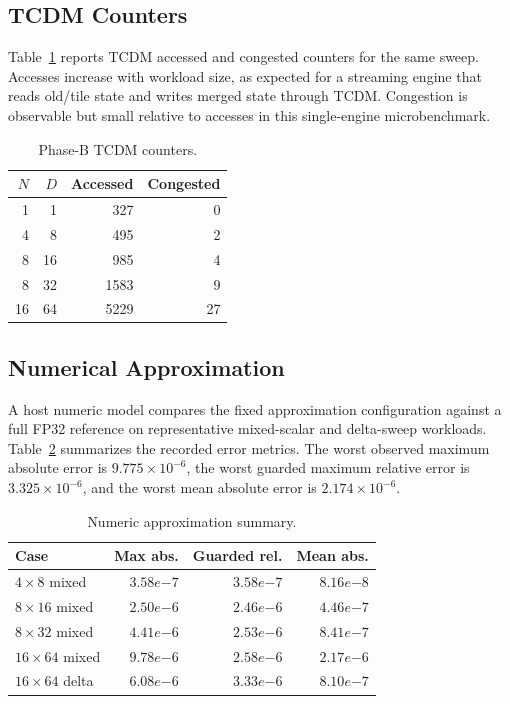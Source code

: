 \documentclass[conference]{IEEEtran}
\begin{document}
\subsection{TCDM Counters}

Table~\ref{tab:tcdm} reports TCDM accessed and congested counters for the same
sweep. Accesses increase with workload size, as expected for a streaming
engine that reads old/tile state and writes merged state through TCDM.
Congestion is observable but small relative to accesses in this single-engine
microbenchmark.

\begin{table}[t]
\centering
\caption{Phase-B TCDM counters.}
\label{tab:tcdm}
\begin{tabular}{rrrr}
\toprule
$N$ & $D$ & Accessed & Congested \\
\midrule
1 & 1 & 327 & 0 \\
4 & 8 & 495 & 2 \\
8 & 16 & 985 & 4 \\
8 & 32 & 1583 & 9 \\
16 & 64 & 5229 & 27 \\
\bottomrule
\end{tabular}
\end{table}

\subsection{Numerical Approximation}

A host numeric model compares the fixed approximation configuration against a
full FP32 reference on representative mixed-scalar and delta-sweep workloads.
Table~\ref{tab:error} summarizes the recorded error metrics. The worst
observed maximum absolute error is $9.775\times10^{-6}$, the worst guarded
maximum relative error is $3.325\times10^{-6}$, and the worst mean absolute
error is $2.174\times10^{-6}$.

\begin{table}[t]
\centering
\caption{Numeric approximation summary.}
\label{tab:error}
\begin{tabular}{lrrr}
\toprule
Case & Max abs. & Guarded rel. & Mean abs. \\
\midrule
$4\times8$ mixed & $3.58e{-7}$ & $3.58e{-7}$ & $8.16e{-8}$ \\
$8\times16$ mixed & $2.50e{-6}$ & $2.46e{-6}$ & $4.46e{-7}$ \\
$8\times32$ mixed & $4.41e{-6}$ & $2.53e{-6}$ & $8.41e{-7}$ \\
$16\times64$ mixed & $9.78e{-6}$ & $2.58e{-6}$ & $2.17e{-6}$ \\
$16\times64$ delta & $6.08e{-6}$ & $3.33e{-6}$ & $8.10e{-7}$ \\
\bottomrule
\end{tabular}
\end{table}
\end{document}
